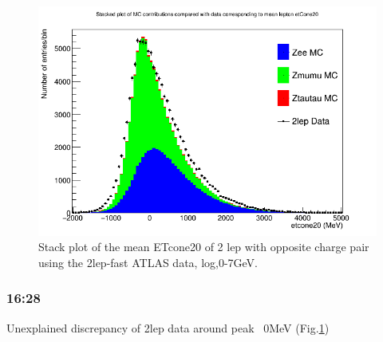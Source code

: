 \begin{figure}[h!]
    \centering
    \includegraphics[width=0.85\linewidth]{plots/16-02-2021/2lep-Zee-Zmumu-Ztautau-fast_mean-etcone20_-2-5GeV_16-02-21_16-28}
    \caption{Stack plot of the mean ETcone20 of 2 lep with opposite charge pair using the 2lep-fast ATLAS data, log,0-7GeV. }\label{fig:2lep-Zee-Zmumu-Ztautau-fast_mean-etcone20_-2-5GeV_16-02-21_16-28}
\end{figure}


\subsubsection*{16:28}
Unexplained discrepancy of 2lep data around peak ~$0$MeV (Fig.\ref{fig:2lep-Zee-Zmumu-Ztautau-fast_mean-etcone20_-2-5GeV_16-02-21_16-28})